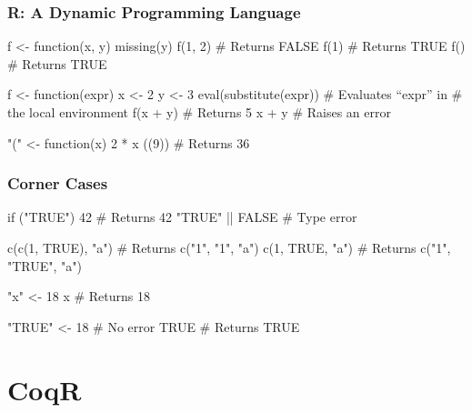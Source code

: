 \documentclass{beamer}
\newcommand\ignore[1]{}
\begin{document}
\begin{frame}[fragile]
    \frametitle{R: A Dynamic Programming Language}

\begin{Rcode}
f <- function(x, y) missing(y)
f(1, 2)                          # Returns FALSE
f(1)                             # Returns TRUE
f()                              # Returns TRUE
\end{Rcode}

\pause

\begin{Rcode}
f <- function(expr) {
    x <- 2
    y <- 3
    eval(substitute(expr))       # Evaluates “expr” in
                                 # the local environment
  }
f(x + y)                         # Returns 5
x + y                            # Raises an error
\end{Rcode}

\pause

\begin{Rcode}
"(" <- function(x) 2 * x
((9))                            # Returns 36
\end{Rcode}
\ignore) %

\end{frame}

\begin{frame}[fragile]
    \frametitle{Corner Cases}

\begin{Rcode}
if ("TRUE") 42            # Returns 42
"TRUE" || FALSE           # Type error
\end{Rcode}

\begin{Rcode}
c(c(1, TRUE), "a")        # Returns c("1", "1", "a")
c(1, TRUE, "a")           # Returns c("1", "TRUE", "a")
\end{Rcode}

\begin{Rcode}
"x" <- 18
x                         # Returns 18

"TRUE" <- 18              # No error
TRUE                      # Returns TRUE
\end{Rcode}

\end{frame}

\section{CoqR}
\end{document}
